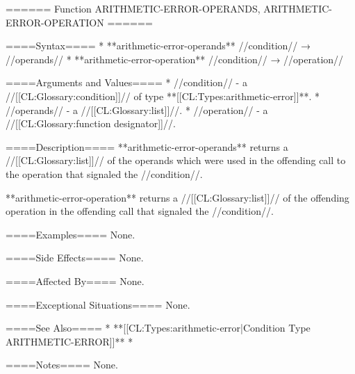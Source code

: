 ====== Function ARITHMETIC-ERROR-OPERANDS, ARITHMETIC-ERROR-OPERATION ======

====Syntax====
  * **arithmetic-error-operands** //condition// → //operands// 
  * **arithmetic-error-operation** //condition// → //operation//

====Arguments and Values====
  * //condition// - a //[[CL:Glossary:condition]]// of type **[[CL:Types:arithmetic-error]]**.
  * //operands// - a //[[CL:Glossary:list]]//.
  * //operation// - a //[[CL:Glossary:function designator]]//.

====Description====
**arithmetic-error-operands** returns a //[[CL:Glossary:list]]// of the operands which were used in the offending call to the operation that signaled the //condition//.

**arithmetic-error-operation** returns a //[[CL:Glossary:list]]// of the offending operation in the offending call that signaled the //condition//.

====Examples====
None.

====Side Effects====
None.

====Affected By====
None.

====Exceptional Situations====
None.

====See Also====
  * **[[CL:Types:arithmetic-error|Condition Type ARITHMETIC-ERROR]]**
  * {\chapref\Conditions}

====Notes====
None.
